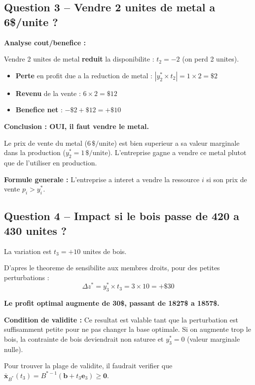 \documentclass[12pt,a4paper]{article}
\begin{document}
\subsection{Question 3 -- Vendre 2 unites de metal a 6\$/unite ?}

\begin{correction}
\textbf{Analyse cout/benefice :}

Vendre 2 unites de metal \textcolor{importantrouge}{\textbf{reduit}} la disponibilite : $t_2 = -2$ (on perd 2 unites).

\begin{itemize}
    \item \textbf{Perte} en profit due a la reduction de metal : $|y_2^* \times t_2| = 1 \times 2 = \$2$
    \item \textbf{Revenu} de la vente : $6 \times 2 = \$12$
    \item \textbf{Benefice net} : $-\$2 + \$12 = +\$10$
\end{itemize}

\textcolor{defvert}{\textbf{Conclusion : OUI, il faut vendre le metal.}}

Le prix de vente du metal ($6\,\$/\text{unite}$) est bien superieur a sa valeur marginale dans la production ($y_2^* = 1\,\$/\text{unite}$). L'entreprise gagne a vendre ce metal plutot que de l'utiliser en production.

\textbf{Formule generale :} L'entreprise a interet a vendre la ressource $i$ si son prix de vente $p_i > y_i^*$.
\end{correction}

\subsection{Question 4 -- Impact si le bois passe de 420 a 430 unites ?}

\begin{correction}
La variation est $t_3 = +10$ unites de bois.

D'apres le theoreme de sensibilite aux membres droits, pour des petites perturbations :
$$\Delta z^* = y_3^* \times t_3 = 3 \times 10 = +\$30$$

\textcolor{defvert}{\textbf{Le profit optimal augmente de 30\$, passant de 1827\$ a 1857\$.}}

\textbf{Condition de validite :} Ce resultat est valable tant que la perturbation est suffisamment petite pour ne pas changer la base optimale. Si on augmente trop le bois, la contrainte de bois deviendrait non saturee et $y_3^* = 0$ (valeur marginale nulle).

Pour trouver la plage de validite, il faudrait verifier que $\bar{\mathbf{x}}_{B^*}(t_3) = B^{*-1}(\mathbf{b} + t_3 \mathbf{e}_3) \geq \mathbf{0}$.
\end{correction}
\end{document}

